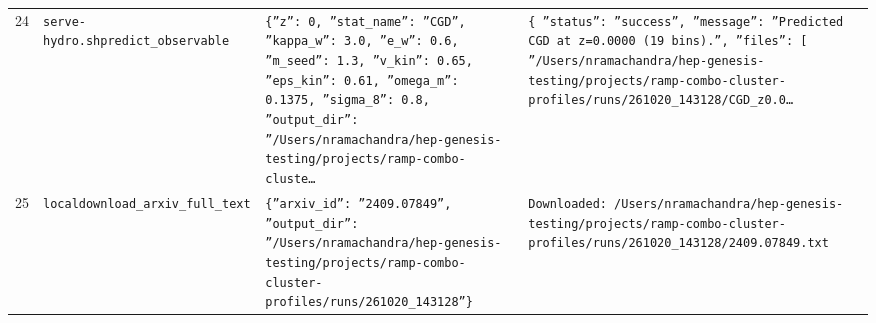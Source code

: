 \documentclass[11pt,a4paper]{article}
\begin{document}
\begin{longtable}{@{}p{}p{}p{}p{}@{}}
24 & \texttt{serve-hydro.sh}\newline\texttt{predict\_\allowbreak{}observable} & \texttt{\{''z'':\allowbreak{} 0,\allowbreak{} ''stat\_\allowbreak{}name'':\allowbreak{} ''CGD'',\allowbreak{} ''kappa\_\allowbreak{}w'':\allowbreak{} 3.0,\allowbreak{} ''e\_\allowbreak{}w'':\allowbreak{} 0.6,\allowbreak{} ''m\_\allowbreak{}seed'':\allowbreak{} 1.3,\allowbreak{} ''v\_\allowbreak{}kin'':\allowbreak{} 0.65,\allowbreak{} ''eps\_\allowbreak{}kin'':\allowbreak{} 0.61,\allowbreak{} ''omega\_\allowbreak{}m'':\allowbreak{} 0.1375,\allowbreak{} ''sigma\_\allowbreak{}8'':\allowbreak{} 0.8,\allowbreak{} ''output\_\allowbreak{}dir'':\allowbreak{} ''/\allowbreak{}Users/\allowbreak{}nramachandra/\allowbreak{}hep-genesis-testing/\allowbreak{}projects/\allowbreak{}ramp-combo-cluste\ldots{}\allowbreak{}} & \texttt{\{   ''status'':\allowbreak{} ''success'',\allowbreak{}   ''message'':\allowbreak{} ''Predicted CGD at z=\allowbreak{}0.0000 (19 bins)\allowbreak{}.'',\allowbreak{}   ''files'':\allowbreak{} [     ''/\allowbreak{}Users/\allowbreak{}nramachandra/\allowbreak{}hep-genesis-testing/\allowbreak{}projects/\allowbreak{}ramp-combo-cluster-profiles/\allowbreak{}runs/\allowbreak{}261020\_\allowbreak{}143128/\allowbreak{}CGD\_\allowbreak{}z0.0\ldots{}\allowbreak{}} \\
25 & \texttt{local}\newline\texttt{download\_\allowbreak{}arxiv\_\allowbreak{}full\_\allowbreak{}text} & \texttt{\{''arxiv\_\allowbreak{}id'':\allowbreak{} ''2409.07849'',\allowbreak{} ''output\_\allowbreak{}dir'':\allowbreak{} ''/\allowbreak{}Users/\allowbreak{}nramachandra/\allowbreak{}hep-genesis-testing/\allowbreak{}projects/\allowbreak{}ramp-combo-cluster-profiles/\allowbreak{}runs/\allowbreak{}261020\_\allowbreak{}143128''\}\allowbreak{}} & \texttt{Downloaded:\allowbreak{} /\allowbreak{}Users/\allowbreak{}nramachandra/\allowbreak{}hep-genesis-testing/\allowbreak{}projects/\allowbreak{}ramp-combo-cluster-profiles/\allowbreak{}runs/\allowbreak{}261020\_\allowbreak{}143128/\allowbreak{}2409.07849.txt} \\

\end{longtable}
\end{document}
